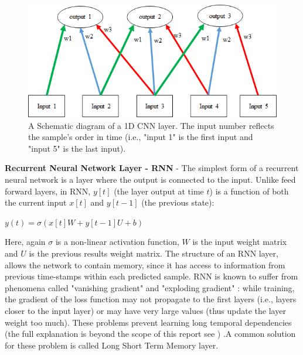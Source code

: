 \documentclass[
12pt, %
english, %
doublespacing, %
headsepline, %
]{MastersDoctoralThesis} %
\begin{document}
\begin{figure}[t]
			\centering
			\includegraphics{CNN_Example_v2.png}
			\caption[A Schematic diagram of a 1D CNN layer. The input number reflects the sample's order in time (i.e., "input 1" is the first input and "input 5" is the last input).]{A Schematic diagram of a 1D CNN layer. The input number reflects the sample's order in time (i.e., "input 1" is the first input and "input 5" is the last input).}
			\label{fig:CNN_Example}
\end{figure}

\textbf{Recurrent Neural Network Layer - RNN} - The simplest form of a recurrent neural network \cite{rumelhart1985learning, werbos1988generalization} is a layer where the output is connected to the input. Unlike feed forward layers, in RNN, $y[t]$ (the layer output at time $t$) is a function of both the current input $x[t]$ and $y[t-1]$ (the previous state): 

	$y\left( t \right) = \sigma \left( {x\left[t \right]W + y\left[ {t - 1} \right]U + b} \right)$

Here, again $\sigma $ is a non-linear activation function, $W$ is the input weight matrix and $U$ is the previous results weight matrix. The structure of an RNN layer, allows the network to contain memory, since it has access to information from previous time-stamps within each predicted sample. RNN is known to suffer from phenomena called "vanishing gradient" and "exploding gradient" \cite{pascanu2013difficulty}: while training, the gradient of the loss function may not propagate to the first layers (i.e., layers closer to the input layer) or may have very large values (thus update the layer weight too much). These problems prevent learning long temporal dependencies (the full explanation is beyond the scope of this report see \cite{bengio1994learning}) .A common solution for these problem is called Long Short Term Memory layer.
\end{document}
